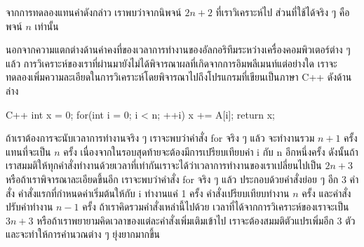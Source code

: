 จาก{\wbr}การ{\wbr}ทดลอง{\wbr}แทน{\wbr}ค่า{\wbr}ดังกล่าว เรา{\wbr}พบ{\wbr}ว่า{\wbr}จาก{\wbr}นิพจน์ $2n+2$ ที่{\wbr}เรา{\wbr}วิเคราะห์{\wbr}ไป ส่วน{\wbr}ที่{\wbr}ใช้ได้{\wbr}จริง{\wbr}
ๆ คือ{\wbr}พจน์ $n$ เท่านั้น  

นอกจาก{\wbr}ความ{\wbr}แตกต่าง{\wbr}ด้าน{\wbr}ค่าคงที่{\wbr}ของ{\wbr}เวลา{\wbr}การ{\wbr}ทำงาน{\wbr}ของ{\wbr}อัล{\wbr}กอ{\wbr}ริ{\wbr}ทึม{\wbr}ระหว่าง{\wbr}เครื่อง{\wbr}คอมพิวเตอร์{\wbr}ต่าง{\wbr}
ๆ แล้ว การ{\wbr}วิเคราะห์{\wbr}ของ{\wbr}เรา{\wbr}ที่{\wbr}ผ่าน{\wbr}มา{\wbr}ยัง{\wbr}ไม่{\wbr}ได้{\wbr}พิจารณา{\wbr}ผล{\wbr}ที่{\wbr}เกิด{\wbr}จาก{\wbr}การ{\wbr}อิม{\wbr}พลี{\wbr}เมนท์{\wbr}แต่อย่างใด{\wbr}
เรา{\wbr}จะ{\wbr}ทดลอง{\wbr}เพิ่ม{\wbr}ความ{\wbr}ละเอียด{\wbr}ใน{\wbr}การ{\wbr}วิเคราะห์{\wbr}โดย{\wbr}พิจารณา{\wbr}ไป{\wbr}ถึง{\wbr}โปรแกรม{\wbr}ที่{\wbr}เขียน{\wbr}เป็น{\wbr}ภาษา{\wbr}
C++ ดัง{\wbr}ด้าน{\wbr}ล่าง{\wbr}

\latintext
\begin{codelist}{C++}{}
int x = 0;
for(int i = 0; i < n; ++i)
  x += A[i];
return x;
\end{codelist}
\thaitext

ถ้า{\wbr}เรา{\wbr}ต้องการ{\wbr}จะ{\wbr}นับ{\wbr}เวลา{\wbr}การ{\wbr}ทำงาน{\wbr}จริง ๆ เรา{\wbr}จะ{\wbr}พบ{\wbr}ว่า{\wbr}คำสั่ง {\ct for} จริง ๆ แล้ว{\wbr}
จะ{\wbr}ทำงาน{\wbr}รวม $n+1$ ครั้ง แทน{\wbr}ที่{\wbr}จะ{\wbr}เป็น $n$ ครั้ง{\wbr}
เนื่องจาก{\wbr}ใน{\wbr}รอบ{\wbr}สุดท้าย{\wbr}จะ{\wbr}ต้อง{\wbr}มี{\wbr}การ{\wbr}เปรียบเทียบ{\wbr}ค่า {\ct i} กับ {\ct n} อีก{\wbr}หนึ่ง{\wbr}ครั้ง{\wbr}
ดังนั้น{\wbr}ถ้า{\wbr}เรา{\wbr}สมมติ{\wbr}ให้{\wbr}ทุก{\wbr}คำสั่ง{\wbr}ทำงาน{\wbr}ด้วย{\wbr}เวลา{\wbr}ที่{\wbr}เท่า{\wbr}กัน{\wbr}เรา{\wbr}จะ{\wbr}ได้{\wbr}ว่า{\wbr}เวลา{\wbr}การ{\wbr}ทำงาน{\wbr}ของ{\wbr}เรา{\wbr}เปลี่ยน{\wbr}ไป{\wbr}เป็น{\wbr}
$2n+3$ หรือ{\wbr}ถ้า{\wbr}เรา{\wbr}พิจารณา{\wbr}ละเอียด{\wbr}ขึ้น{\wbr}อีก เรา{\wbr}จะ{\wbr}พบ{\wbr}ว่า{\wbr}คำสั่ง {\ct for} จริง ๆ แล้ว{\wbr}
ประกอบ{\wbr}ด้วย{\wbr}คำสั่ง{\wbr}ย่อย ๆ อีก 3 คำสั่ง คำสั่ง{\wbr}แรก{\wbr}ที่{\wbr}กำหนด{\wbr}ค่า{\wbr}เริ่มต้น{\wbr}ให้{\wbr}กับ {\ct i} ทำงาน{\wbr}แค่{\wbr}
1 ครั้ง คำสั่ง{\wbr}เปรียบเทียบ{\wbr}ทำงาน $n$ ครั้ง และ{\wbr}คำสั่ง{\wbr}ปรับ{\wbr}ค่า{\wbr}ทำงาน $n-1$ ครั้ง{\wbr}
ถ้า{\wbr}เรา{\wbr}คิด{\wbr}รวม{\wbr}คำสั่ง{\wbr}เหล่านี้{\wbr}ไป{\wbr}ด้วย เวลา{\wbr}ที่{\wbr}ได้{\wbr}จาก{\wbr}การ{\wbr}วิเคราะห์{\wbr}ของ{\wbr}เรา{\wbr}จะ{\wbr}เป็น $3n+3$
หรือ{\wbr}ถ้า{\wbr}เรา{\wbr}พยายาม{\wbr}คิด{\wbr}เวลา{\wbr}ของ{\wbr}แต่ละ{\wbr}คำสั่ง{\wbr}เพิ่มเติม{\wbr}เข้า{\wbr}ไป เรา{\wbr}จะ{\wbr}ต้อง{\wbr}สมมติ{\wbr}ตัวแปร{\wbr}เพิ่ม{\wbr}อีก 3
ตัว{\wbr}และ{\wbr}จะ{\wbr}ทำ{\wbr}ให้การ{\wbr}คำนวณ{\wbr}ต่าง ๆ ยุ่งยาก{\wbr}มาก{\wbr}ขึ้น{\wbr}

